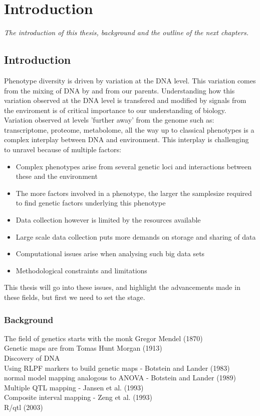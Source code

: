 \chapter{Introduction}
\emph{The introduction of this thesis, background and the outline of the next chapters.}

\null
\vfill
\newpage

\section{Introduction}

Phenotype diversity is driven by variation at the DNA level. This variation comes from the mixing of 
DNA by and from our parents. Understanding how this variation observed at the DNA level is transfered 
and modified by signals from the enviroment is of critical importance to our understanding of 
biology. Variation observed at levels 'further away' from the genome such as: transcriptome, proteome, 
metabolome, all the way up to classical phenotypes is a complex interplay between DNA and 
environment. This interplay is challenging to unravel because of multiple factors:\\
\begin{itemize}
\item Complex phenotypes arise from several genetic loci and interactions between these and the 
environment
\item The more factors involved in a phenotype, the larger the samplesize required to find genetic 
factors underlying this phenotype
\item Data collection however is limited by the resources available
\item Large scale data collection puts more demands on storage and sharing of data
\item Computational issues arise when analysing such big data sets
\item Methodological constraints and limitations
\end{itemize}

This thesis will go into these issues, and highlight the advancements made in these 
fields, but first we need to set the stage.

\subsection{Background}

The field of genetics starts with the monk Gregor Mendel (1870)\\
Genetic maps are from Tomas Hunt Morgan (1913)\\
Discovery of DNA\\
Using RLPF markers to build genetic maps - Botstein and Lander (1983)\\
normal model mapping analogous to ANOVA - Botstein and Lander (1989)\\
Multiple QTL mapping - Jansen et al. (1993)\\
Composite interval mapping -  Zeng et al. (1993)\\
R/qtl (2003)\\


